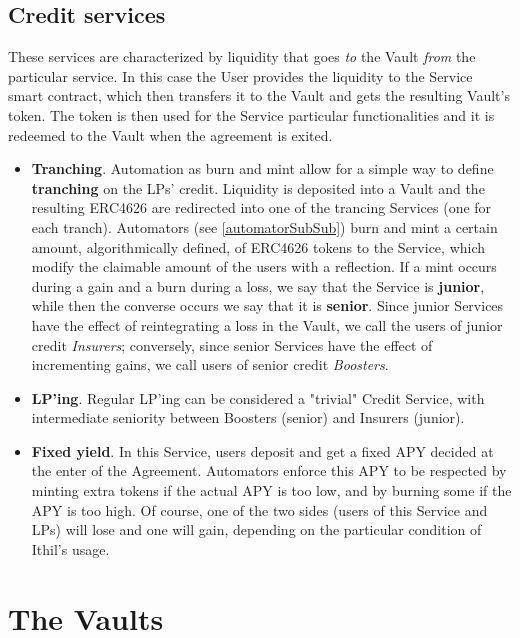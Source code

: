 \documentclass[a4paper,10 pt]{article}
\theoremstyle{definition}
\begin{document}
\subsection{Credit services}\label{csFirstSec}

These services are characterized by liquidity that goes {\it to} the Vault {\it from} the particular service. In this case the User provides the liquidity to the Service smart contract, which then transfers it to the Vault and gets the resulting Vault's token. The token is then used for the Service particular functionalities and it is redeemed to the Vault when the agreement is exited.

\begin{itemize}
\item {\bf Tranching}. Automation as burn and mint allow for a simple way to define {\bf tranching} on the LPs' credit. Liquidity is deposited into a Vault and the resulting ERC4626 are redirected into one of the trancing Services (one for each tranch). Automators (see \ref{automatorSubSub}) burn and mint a certain amount, algorithmically defined, of ERC4626 tokens to the Service, which modify the claimable amount of the users with a reflection. If a mint occurs during a gain and a burn during a loss, we say that the Service is {\bf junior}, while then the converse occurs we say that it is {\bf senior}. Since junior Services have the effect of reintegrating a loss in the Vault, we call the users of junior credit {\it Insurers}; conversely, since senior Services have the effect of incrementing gains, we call users of senior credit {\it Boosters}.

\item {\bf LP'ing}. Regular LP'ing can be considered a "trivial" Credit Service, with intermediate seniority between Boosters (senior) and Insurers (junior).

\item {\bf Fixed yield}. In this Service, users deposit and get a fixed APY decided at the enter of the Agreement. Automators enforce this APY to be respected by minting extra tokens if the actual APY is too low, and by burning some if the APY is too high. Of course, one of the two sides (users of this Service and LPs) will lose and one will gain, depending on the particular condition of Ithil's usage.
\end{itemize}

\newpage
\section{The Vaults}\label{vaultSec}
\end{document}
